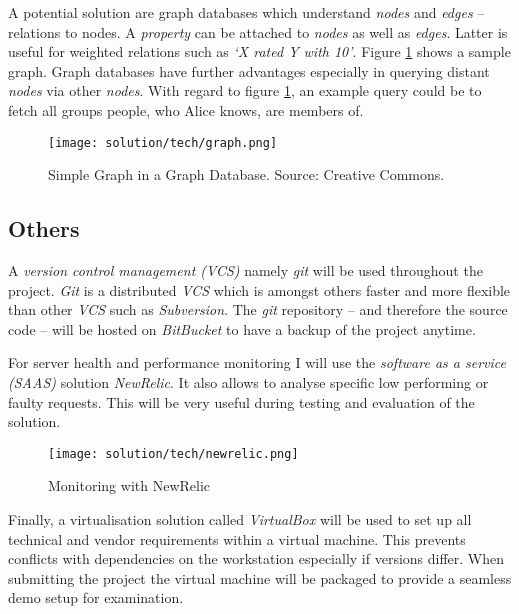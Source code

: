 A potential solution are graph databases which understand \emph{nodes} and \emph{edges} -- relations to nodes. A \emph{property} can be attached to \emph{nodes} as well as \emph{edges}. Latter is useful for weighted relations such as \emph{`X rated Y with 10'}. Figure \ref{fig:graph} shows a sample graph. Graph databases have further advantages especially in querying distant \emph{nodes} via other \emph{nodes}. With regard to figure \ref{fig:graph}, an example query could be to fetch all groups people, who Alice knows, are members of.

\begin{figure}[ht]
    \texttt{[image: solution/tech/graph.png]}
    \caption[Simple Graph in a Graph Database]{Simple Graph in a Graph Database. Source: Creative Commons.}
    \label{fig:graph}
\end{figure}

\subsection{Others}

A \emph{version control management (VCS)} namely \emph{git} will be used throughout the project. \emph{Git} is a distributed \emph{VCS} which is amongst others faster and more flexible than other \emph{VCS} such as \emph{Subversion}. The \emph{git} repository -- and therefore the source code -- will be hosted on \emph{BitBucket} to have a backup of the project anytime.

For server health and performance monitoring I will use the \emph{software as a service (SAAS)} solution \emph{NewRelic}. It also allows to analyse specific low performing or faulty requests. This will be very useful during testing and evaluation of the solution.

\begin{figure}[ht]
    \texttt{[image: solution/tech/newrelic.png]}
    \caption{Monitoring with NewRelic}
    \label{fig:newrelic}
\end{figure}

Finally, a virtualisation solution called \emph{VirtualBox} will be used to set up all technical and vendor requirements within a virtual machine. This prevents conflicts with dependencies on the workstation especially if versions differ. When submitting the project the virtual machine will be packaged to provide a seamless demo setup for examination.



